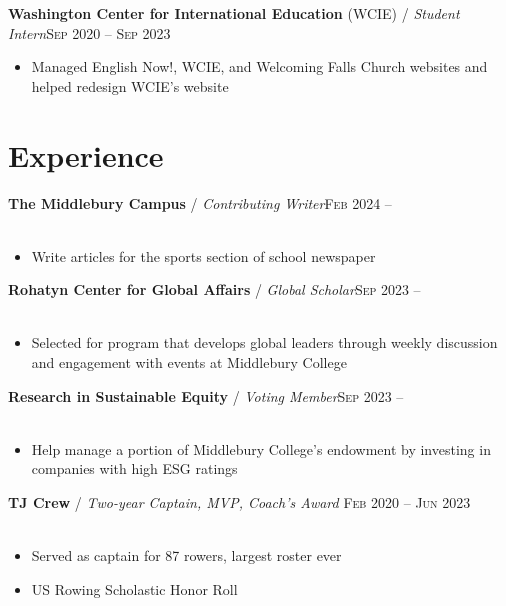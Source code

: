 \documentclass[12pt, a4paper]{article}
\begin{document}
\textbf{Washington Center for International Education} (WCIE) / \textit{Student Intern}\hfill\textsc{Sep 2020 -- Sep 2023}\\
\begin{itemize}
    \vspace{-8mm}
    \item Managed English Now!, WCIE, and Welcoming Falls Church websites and helped redesign WCIE's website
\end{itemize}

\vspace{-8mm}
\section*{Experience}
\vspace{-2mm}

\textbf{The Middlebury Campus} / \textit{Contributing Writer}\hfill\textsc{Feb 2024 --}\\\
\begin{itemize}
    \vspace{-8mm}
    \item Write articles for the sports section of school newspaper
\end{itemize}

\textbf{Rohatyn Center for Global Affairs} / \textit{Global Scholar}\hfill\textsc{Sep 2023 --}\\\
\begin{itemize}
    \vspace{-8mm}
    \item Selected for program that develops global leaders through weekly discussion and engagement with events at Middlebury College
\end{itemize}

\textbf{Research in Sustainable Equity} / \textit{Voting Member}\hfill\textsc{Sep 2023 --}\\\
\begin{itemize}
    \vspace{-8mm}
    \item Help manage a portion of Middlebury College's endowment by investing in companies with high ESG ratings
\end{itemize}

\textbf{TJ Crew} / \textit{Two-year Captain, MVP, Coach's Award }\hfill\textsc{Feb 2020 -- Jun 2023}\\\
\begin{itemize}
    \vspace{-8mm}
    \item Served as captain for 87 rowers, largest roster ever
    \item US Rowing Scholastic Honor Roll
\end{itemize}
\end{document}
